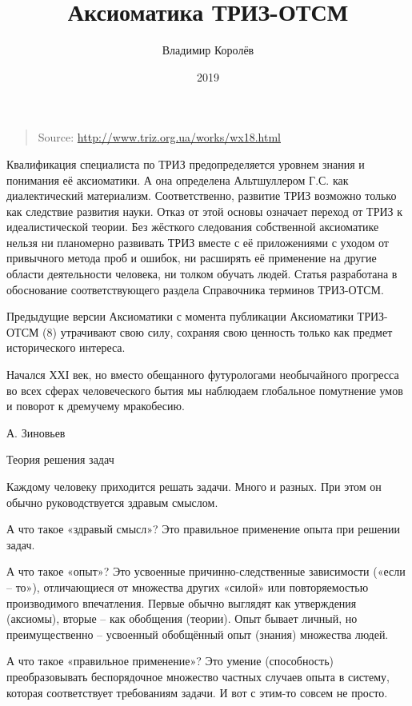 \documentclass[11pt,a4paper]{article}
\title{Аксиоматика ТРИЗ-ОТСМ}
\author{Владимир Королёв}
\date{2019}
\begin{document}
\maketitle

\begin{quote}
  Source: \url{http://www.triz.org.ua/works/wx18.html}
\end{quote}

Квалификация специалиста по ТРИЗ предопределяется уровнем знания и понимания её аксиоматики. А она определена Альтшуллером Г.С. как диалектический материализм. Соответственно, развитие ТРИЗ возможно только как следствие развития науки. Отказ от этой основы означает переход от ТРИЗ к идеалистической теории. Без жёсткого следования собственной аксиоматике нельзя ни планомерно развивать ТРИЗ вместе с её приложениями с уходом от привычного метода проб и ошибок, ни расширять её применение на другие области деятельности человека, ни толком обучать людей. Статья разработана в обоснование соответствующего раздела Справочника терминов ТРИЗ-ОТСМ.

Предыдущие версии Аксиоматики с момента публикации Аксиоматики ТРИЗ-ОТСМ (8) утрачивают свою силу, сохраняя свою ценность только как предмет исторического интереса.

Начался ХХІ век, но вместо обещанного футурологами необычайного прогресса во всех сферах человеческого бытия мы наблюдаем глобальное помутнение умов и поворот к дремучему мракобесию.

А. Зиновьев

Теория решения задач

 

Каждому человеку приходится решать задачи. Много и разных. При этом он обычно руководствуется здравым смыслом.

А что такое «здравый смысл»? Это правильное применение опыта при решении задач.

А что такое «опыт»? Это усвоенные причинно-следственные зависимости («если – то»), отличающиеся от множества других «силой» или повторяемостью производимого впечатления. Первые обычно выглядят как утверждения (аксиомы), вторые – как обобщения (теории). Опыт бывает личный, но преимущественно – усвоенный обобщённый опыт (знания) множества людей.

А что такое «правильное применение»? Это умение (способность) преобразовывать беспорядочное множество частных случаев опыта в систему, которая соответствует требованиям задачи. И вот с этим-то совсем не просто.
\end{document}
